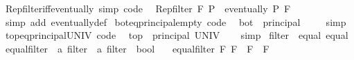 \begin{isabellebody}
\ Rep{\isacharunderscore}{\kern0pt}filter{\isacharunderscore}{\kern0pt}iff{\isacharunderscore}{\kern0pt}eventually\ {\isacharbrackleft}{\kern0pt}simp{\isacharcomma}{\kern0pt}\ code{\isacharbrackright}{\kern0pt}{\isacharcolon}{\kern0pt}\isanewline
\ \ {\isachardoublequoteopen}Rep{\isacharunderscore}{\kern0pt}filter\ F\ P\ {\isasymlongleftrightarrow}\ eventually\ P\ F{\isachardoublequoteclose}\isanewline
%
\isadelimproof
\ \ %
\endisadelimproof
%
\isatagproof
{}\isamarkupfalse%
\ {\isacharparenleft}{\kern0pt}simp\ add{\isacharcolon}{\kern0pt}\ eventually{\isacharunderscore}{\kern0pt}def{\isacharparenright}{\kern0pt}%
\endisatagproof
{\isafoldproof}%
%
\isadelimproof
\isanewline
%
\endisadelimproof
\isanewline
{}\isamarkupfalse%
\ bot{\isacharunderscore}{\kern0pt}eq{\isacharunderscore}{\kern0pt}principal{\isacharunderscore}{\kern0pt}empty\ {\isacharbrackleft}{\kern0pt}code{\isacharbrackright}{\kern0pt}{\isacharcolon}{\kern0pt}\isanewline
\ \ {\isachardoublequoteopen}bot\ {\isacharequal}{\kern0pt}\ principal\ {\isacharbraceleft}{\kern0pt}{\isacharbraceright}{\kern0pt}{\isachardoublequoteclose}\isanewline
%
\isadelimproof
\ \ %
\endisadelimproof
%
\isatagproof
{}\isamarkupfalse%
\ simp%
\endisatagproof
{\isafoldproof}%
%
\isadelimproof
\isanewline
%
\endisadelimproof
\isanewline
{}\isamarkupfalse%
\ top{\isacharunderscore}{\kern0pt}eq{\isacharunderscore}{\kern0pt}principal{\isacharunderscore}{\kern0pt}UNIV\ {\isacharbrackleft}{\kern0pt}code{\isacharbrackright}{\kern0pt}{\isacharcolon}{\kern0pt}\isanewline
\ \ {\isachardoublequoteopen}top\ {\isacharequal}{\kern0pt}\ principal\ UNIV{\isachardoublequoteclose}\isanewline
%
\isadelimproof
\ \ %
\endisadelimproof
%
\isatagproof
{}\isamarkupfalse%
\ simp%
\endisatagproof
{\isafoldproof}%
%
\isadelimproof
\isanewline
%
\endisadelimproof
\isanewline
{}\isamarkupfalse%
\ filter\ {\isacharcolon}{\kern0pt}{\isacharcolon}{\kern0pt}\ {\isacharparenleft}{\kern0pt}equal{\isacharparenright}{\kern0pt}\ equal\isanewline
{}\isanewline
\isanewline
{}\isamarkupfalse%
\ equal{\isacharunderscore}{\kern0pt}filter\ {\isacharcolon}{\kern0pt}{\isacharcolon}{\kern0pt}\ {\isachardoublequoteopen}{\isacharprime}{\kern0pt}a\ filter\ {\isasymRightarrow}\ {\isacharprime}{\kern0pt}a\ filter\ {\isasymRightarrow}\ bool{\isachardoublequoteclose}\isanewline
\ \ \ {\isachardoublequoteopen}equal{\isacharunderscore}{\kern0pt}filter\ F\ F{\isacharprime}{\kern0pt}\ {\isasymlongleftrightarrow}\ F\ {\isacharequal}{\kern0pt}\ F{\isacharprime}{\kern0pt}{\isachardoublequoteclose}\isanewline

\end{isabellebody}
